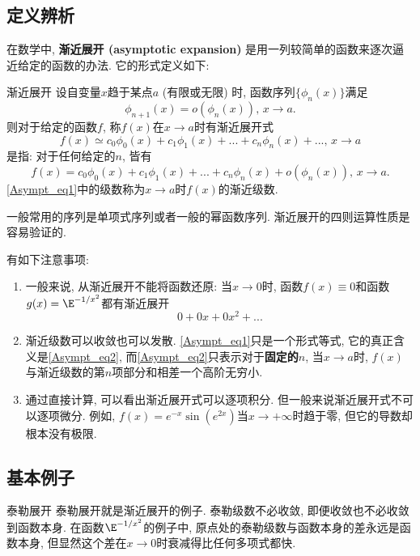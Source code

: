 
\subsection{定义辨析}
在数学中, \textbf{渐近展开 (asymptotic expansion)} 是用一列较简单的函数来逐次逼近给定的函数的办法. 它的形式定义如下:

\begin{definition}{渐近展开}
设自变量$x$趋于某点$a$ (有限或无限) 时, 函数序列$\{\phi_{n}(x)\}$满足
$$
\phi_{n+1}(x)=o(\phi_n(x)),\,x\to a.
$$
则对于给定的函数$f$, 称$f(x)$在$x\to a$时有渐近展开式
\begin{equation}\label{Asympt_eq1}
f(x)\simeq c_0\phi_0(x)+c_1\phi_1(x)+...+c_n\phi_n(x)+...,\,x\to a
\end{equation}
是指: 对于任何给定的$n$, 皆有
\begin{equation}\label{Asympt_eq2}
f(x)=c_0\phi_0(x)+c_1\phi_1(x)+...+c_n\phi_n(x)+o(\phi_n(x)),\,x\to a.
\end{equation}
\autoref{Asympt_eq1}中的级数称为$x\to a$时$f(x)$的渐近级数.
\end{definition}

一般常用的序列是单项式序列或者一般的幂函数序列. 渐近展开的四则运算性质是容易验证的.

有如下注意事项:
\begin{enumerate}
\item 一般来说, 从渐近展开不能将函数还原: 当$x\to0$时, 函数$f(x)\equiv 0$和函数$g(x)=\E^{-1/x^2}$都有渐近展开
$$
0+0x+0x^2+...
$$

\item 渐近级数可以收敛也可以发散. \autoref{Asympt_eq1}只是一个形式等式, 它的真正含义是\autoref{Asympt_eq2}, 而\autoref{Asympt_eq2}只表示对于\textbf{固定的$n$}, 当$x\to a$时, $f(x)$与渐近级数的第$n$项部分和相差一个高阶无穷小. 

\item 通过直接计算, 可以看出渐近展开式可以逐项积分. 但一般来说渐近展开式不可以逐项微分. 例如, $f(x)=e^{-x}\sin(e^{2x})$当$x\to+\infty$时趋于零, 但它的导数却根本没有极限.
\end{enumerate}

\subsection{基本例子}
\begin{example}{泰勒展开}
泰勒展开就是渐近展开的例子. 泰勒级数不必收敛, 即便收敛也不必收敛到函数本身. 在函数$\E^{-1/x^2}$的例子中, 原点处的泰勒级数与函数本身的差永远是函数本身, 但显然这个差在$x\to0$时衰减得比任何多项式都快.
\end{example}

